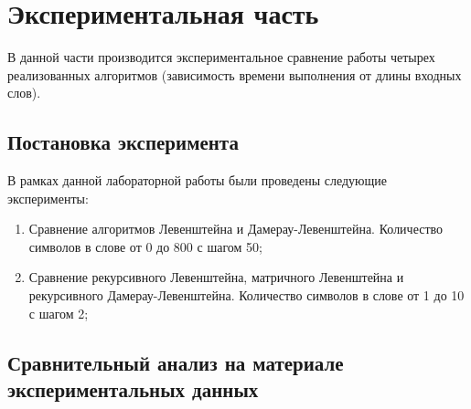\documentclass[a4paper,12pt]{article}
\begin{document}
\section{Экспериментальная часть}
\hfill

В данной части производится экспериментальное сравнение работы четырех реализованных алгоритмов (зависимость времени выполнения от длины входных слов).
\subsection{Постановка эксперимента}
\hfill

В рамках данной лабораторной работы были проведены следующие эксперименты:
\begin{enumerate} 
	\item Сравнение алгоритмов Левенштейна и Дамерау-Левенштейна. Количество символов в слове от 0 до 800 с шагом 50;
	
	\item Сравнение рекурсивного Левенштейна, матричного Левенштейна и рекурсивного Дамерау-Левенштейна. Количество символов в слове от 1 до 10 с шагом 2;
	
\end{enumerate} 
\subsection{Сравнительный анализ на материале экспериментальных данных}
\hfill
\end{document}
